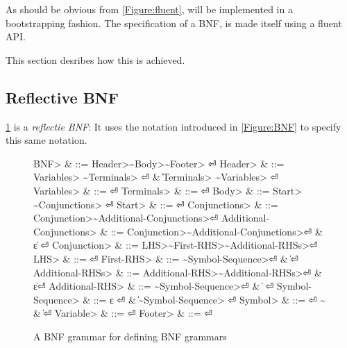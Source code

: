 As should be obvious from \cref{Figure:fluent}, \SELF will be implemented
  in a bootstrapping fashion.
The specification of a BNF, is made itself using a fluent API.


This section desribes how this is achieved.

\subsection{Reflective BNF}
\cref{Figure:BNF:BNF} is a \emph{reflectie BNF}:
It uses the notation introduced in \cref{Figure:BNF}
  to specify this same notation.


\begin{figure}[H]
  \begin{Grammar}
    \begin{aligned}
      \<BNF> & ::= \<Header>\~\<Body>\~\<Footer> \hfill⏎
      \<Header> & ::= \<Variables> \~\<Terminals> \hfill⏎
      {} & \| \<Terminals> \~\<Variables> \hfill⏎
      \<Variables> & ::= \hfill⏎
      \<Terminals> & ::= \hfill⏎
      \<Body> & ::= \<Start> \~\<Conjunctions> \hfill⏎
      \<Start> & ::=  \hfill⏎
      \<Conjunctions> & ::= \<Conjunction>\~\<Additional-Conjunctions>\hfill⏎
      \<Additional-Conjunctions> & ::= \<Conjunction>\~ \<Additional-Conjunctions>\hfill⏎
      {} & \| ε \hfill⏎
      \<Conjunction> & ::= \<LHS>\~\<First-RHS>\~\<Additional-RHSs>\hfill⏎
      \<LHS> & ::= \hfill⏎
      \<First-RHS> & ::=	 \~\<Symbol-Sequence>\hfill⏎
      {} & \| \hfill⏎
      \<Additional-RHSs> & ::= \<Additional-RHS>\~\<Additional-RHSs>\hfill⏎
      {} & \| ε\hfill⏎
      \<Additional-RHS> & ::= \~\<Symbol-Sequence>\hfill⏎
      {} & \|       \hfill⏎
      \<Symbol-Sequence> & ::= ε \hfill⏎
      {} & \| \~\<Symbol-Sequence>      \hfill⏎
      \<Symbol> & ::=  \hfill⏎
      {\~} & \| \hfill⏎
      \<Variable> & ::=  \hfill⏎
      \<Footer> & ::= \hfill⏎
    \end{aligned}
  \end{Grammar}
  \caption{A BNF grammar for defining BNF grammars}
  \label{Figure:BNF:BNF}
\end{figure}
\begin{comment}
Note that this specification can only be approximate;
  the figure uses verbs as replacement to indentation,
  and special symbols such as~$|$,~$::-$ and~$ε$.
\end{comment}

